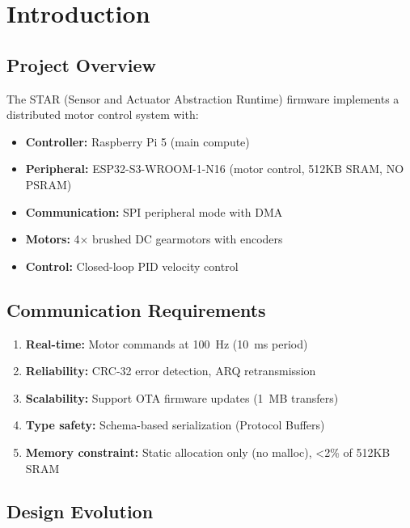 \section{Introduction}

\subsection{Project Overview}

The STAR (Sensor and Actuator Abstraction Runtime) firmware implements a distributed motor control system with:
\begin{itemize}
    \item \textbf{Controller:} Raspberry Pi 5 (main compute)
    \item \textbf{Peripheral:} ESP32-S3-WROOM-1-N16 (motor control, 512KB SRAM, NO PSRAM)
    \item \textbf{Communication:} SPI peripheral mode with DMA
    \item \textbf{Motors:} 4× brushed DC gearmotors with encoders
    \item \textbf{Control:} Closed-loop PID velocity control
\end{itemize}

\subsection{Communication Requirements}

\begin{enumerate}
    \item \textbf{Real-time:} Motor commands at 100~Hz (10~ms period)
    \item \textbf{Reliability:} CRC-32 error detection, ARQ retransmission
    \item \textbf{Scalability:} Support OTA firmware updates (1~MB transfers)
    \item \textbf{Type safety:} Schema-based serialization (Protocol Buffers)
    \item \textbf{Memory constraint:} Static allocation only (no malloc), <2\% of 512KB SRAM
\end{enumerate}

\subsection{Design Evolution}


